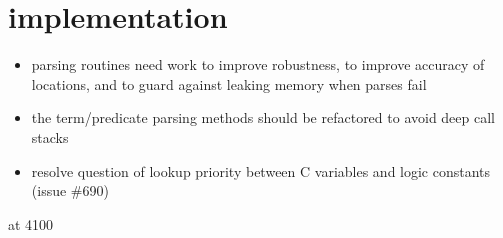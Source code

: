 \section{\acslpp implementation}

\begin{itemize}
\item parsing routines need work to improve robustness, to improve accuracy of locations, and to guard against leaking memory when parses fail
\item the term/predicate parsing methods should be refactored to avoid deep call stacks
\item resolve question of lookup priority between C variables and logic constants (issue \#690)
\end{itemize}



at 4100
